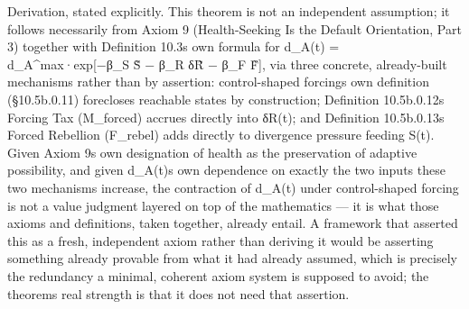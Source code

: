 \documentclass[
]{article}
\begin{document}
Derivation, stated explicitly. This theorem is not an independent
assumption; it follows necessarily from Axiom 9 (Health-Seeking Is the
Default Orientation, Part 3) together with Definition 10.3s own formula
for d\_A(t) = d\_A\^{}max·exp{[}−β\_S S̃ − β\_R δR̃ − β\_F F̃{]}, via three
concrete, already-built mechanisms rather than by assertion:
control-shaped forcings own definition (§10.5b.0.11) forecloses
reachable states by construction; Definition 10.5b.0.12s Forcing Tax
(M\_forced) accrues directly into δR(t); and Definition 10.5b.0.13s
Forced Rebellion (F\_rebel) adds directly to divergence pressure feeding
S(t). Given Axiom 9s own designation of health as the preservation of
adaptive possibility, and given d\_A(t)s own dependence on exactly the
two inputs these two mechanisms increase, the contraction of d\_A(t)
under control-shaped forcing is not a value judgment layered on top of
the mathematics --- it is what those axioms and definitions, taken
together, already entail. A framework that asserted this as a fresh,
independent axiom rather than deriving it would be asserting something
already provable from what it had already assumed, which is precisely
the redundancy a minimal, coherent axiom system is supposed to avoid;
the theorems real strength is that it does not need that assertion.
\end{document}
